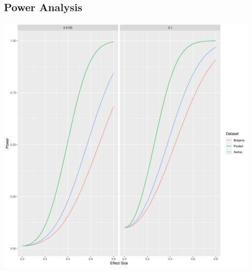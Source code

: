 \message{ !name(bebbo.tex)}\documentclass{article}
\begin{document}










\subsection*{Power Analysis}

\includegraphics[width=\textwidth]{plots/Power Calculations.png}
\end{document}
